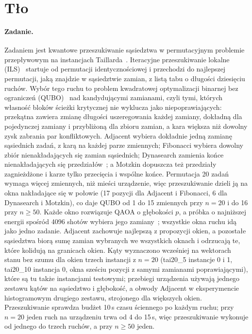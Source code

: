 \documentclass{scspaperproc}
\begin{document}
\section{Tło}

\paragraph{Zadanie.}
Zadaniem jest kwantowe przeszukiwanie sąsiedztwa w permutacyjnym problemie
przepływowym na instancjach Taillarda~\cite{taillard1993}. Iteracyjne
przeszukiwanie lokalne (ILS)~\cite{lourenco2003} startuje od permutacji
identycznościowej i przechodzi do najlepszej permutacji, jaką znajdzie
w sąsiedztwie zamian, z listą tabu o długości dziesięciu ruchów. Wybór tego
ruchu to problem kwadratowej optymalizacji binarnej bez ograniczeń
(QUBO)~\cite{lucas2014ising} nad kandydującymi zamianami, czyli tymi, których
własność bloków ścieżki krytycznej nie wyklucza jako niepoprawiających:
przekątna zawiera zmianę długości uszeregowania każdej zamiany, dokładną dla
pojedynczej zamiany i przybliżoną dla zbioru zamian, a kara większa niż
dowolny zysk zabrania par konfliktowych. Adjacent wybiera dokładnie jedną zamianę sąsiednich zadań, z karą na każdej
parze zmiennych;
Fibonacci wybiera dowolny zbiór nienakładających się zamian sąsiednich;
Dynasearch zamienia końce nienakładających się
przedziałów~\cite{congram2002dynasearch}; a Motzkin dopuszcza też przedziały
zagnieżdżone i karze tylko przecięcia i wspólne końce. Permutacja 20 zadań
wymaga więcej zmiennych, niż mieści urządzenie, więc przeszukiwanie dzieli ją
na okna nakładające się w połowie (17 pozycji dla Adjacent i Fibonacci, 6 dla
Dynasearch i Motzkin), co daje QUBO od 1 do 15 zmiennych przy $n = 20$ i do 16
przy $n \ge 50$. Każde okno rozwiązuje QAOA o głębokości $p$, a próbka
o najniższej energii spośród 4096 shotów wybiera jego
zamiany~\cite{anon2026b,anon2026c}; wszystkie okna ruchu idą jako jedno
zadanie. Adjacent zachowuje najlepszą z propozycji okien, a pozostałe
sąsiedztwa biorą sumę zamian wybranych we wszystkich oknach i odrzucają te,
które kolidują na granicach okien. Kąty wyznaczono wcześniej na wektorach
stanu bez szumu dla okien trzech instancji z $n = 20$ (tai20\_5 instancje 0
i 1, tai20\_10 instancja 0, okna sześciu pozycji z samymi zamianami
poprawiającymi), które są tu także instancjami testowymi; przebiegi urządzenia
używają jednego zestawu kątów na sąsiedztwo i głębokość, a obwody Adjacent
w eksperymencie histogramowym drugiego zestawu, strojonego dla większych okien.
Przeszukiwanie sprawdza budżet 10\,s czasu ściennego po każdym ruchu; przy
$n = 20$ jeden ruch na urządzeniu trwa od 4 do 15\,s, więc przeszukiwanie
wykonuje od jednego do trzech ruchów, a przy $n \ge 50$ jeden.
\end{document}
